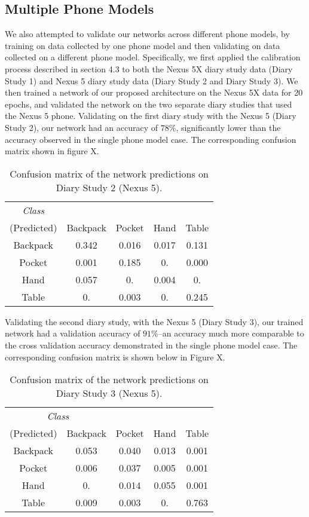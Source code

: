 \subsection{Multiple Phone Models}
We also attempted to validate our networks across different phone models, by training
on data collected by one phone model and then validating on data collected on a 
different phone model. Specifically, we first applied the calibration process described in section 4.3 
to both the Nexus 5X diary study data (Diary Study 1) and Nexus 5 diary study data (Diary Study 2 and Diary Study 3).
We then trained a network of our proposed architecture on the Nexus 5X data for 20 epochs, 
and validated the network on the two separate diary studies that used the
Nexus 5 phone.
Validating on the first diary study with the Nexus 5 (Diary Study 2), our network
had an accuracy of $78\%$, significantly lower than the accuracy observed
in the single phone model case. The corresponding confusion matrix shown in figure X.
\begin{table}[h]
\caption{Confusion matrix of the network predictions on Diary Study 2 (Nexus 5).}\label{fig:confusion} \centering
\begin{tabular}{| c || c | c | c | c }  
\toprule
\multicolumn{1}{c}{\textit{Class}}\multicolumn{4}{c}{(Actual)} \\ \cmidrule{1-5}
(Predicted)		&	Backpack    & 	Pocket 	& 	Hand	&	Table \\
\midrule
Backpack			&	0.342 	&	0.016	&	0.017 	&	0.131 \\
Pocket			&	0.001 	&	0.185 	&	0.	 	&	0.000 \\
Hand			&	0.057 	&	0.	 	&	0.004 	&	0. \\
Table			&	0. 		&	0.003 	&	0.	 	&	0.245\\
\bottomrule
\end{tabular}
\end{table}

Validating the second diary study, with the Nexus 5 (Diary Study 3), our trained network had a validation
accuracy of $91\%$--an accuracy much more comparable to the cross validation accuracy
demonstrated in the single phone model case. The corresponding confusion matrix is 
shown below in Figure X.

\begin{table}[h]
\caption{Confusion matrix of the network predictions on Diary Study 3 (Nexus 5).}\label{fig:confusion} \centering
\begin{tabular}{| c || c | c | c | c }  
\toprule
\multicolumn{2}{c}{\textit{Class}}\multicolumn{3}{c}{(Actual)} \\ \cmidrule{1-5}
(Predicted)		&	Backpack    & 	Pocket 	& 	Hand	&	Table \\
\midrule
Backpack			&	0.053 	&	0.040	&	0.013 	&	0.001 \\
Pocket			&	0.006 	&	0.037 	&	0.005 	&	0.001 \\
Hand			&	0.	 	&	0.014 	&	0.055 	&	0.001 \\
Table			&	0.009 	&	0.003 	&	0.	 	&	0.763\\
\bottomrule
\end{tabular}
\end{table}


